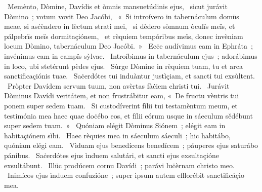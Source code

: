 \psalmChapterWithInscription{}
{ }
{%
~Memènto, Dòmine, Davídis et òmnis mansuetúdinis ejus, 
~sicut jurávit Dòmino~; votum vovit Deo Jacóbi, 
~«~Si introívero in tabernáculum domüs meae, si asċèndero in lèctum strati mei, 
~si dèdero sòmnum òculïs meïs, et pálpebrïs meïs dormitaçiónem, 
~et rèquiem tempóribus meïs, donec invèniam locum Dòmino, tabernáculum Deo Jacóbi.~»
~Ecċe audívimus eam in Ephráta~; invénimus eam in campïs sỳlvae. 
~Introíbimus in tabernáculum ejus~; adorábimus in loco, ubi stetérunt pèdes ejus. 
~Sùrge Dòmine in rèquiem tuam, tu et arca sanctificaçiónis tuae. 
~Saċerdótes tui induàntur justìçiam, et sancti tui exsùltent. 
~Pròpter Davídem servum tuum, non avèrtas fàċiem christi tui. 
~Jurávit Dòminus Davídi veritátem, et non frustrábitur eam, «~De fructu vèntris tui ponem super sedem tuam. 
~Si custodíverint fílii tui testamèntum meum, et testimónia mea haec quae doċébo eos, et fílii eórum usque in sáeculum sědébunt super sedem tuam.~»
~Quóniam elégit Dòminus Siónem~; elégit eam in habitaçiónem sìbi. 
~Haec rèquies mea in sáeculum sáeculi~; hic habitábo, quóniam elégi eam. 
~Vìduam ejus benedícens benedícem~; páuperes ejus saturábo pánibus. 
~Saċerdótes ejus ìnduem salutári, et sancti ejus exsultaçióne exsultábunt. 
~Illüc prodúcem cornu Davídi~; parávi luċèrnam christo meo. 
~Inimícos ejus ìnduem confuzióne~; super ìpsum autem efflorébit sanctificáçio mea. 
}
